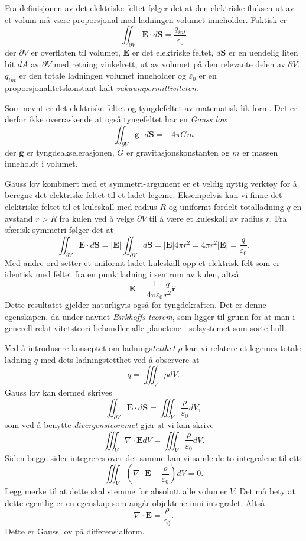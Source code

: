 \documentclass[twoside,utf8]{article}
\begin{document}
Fra definisjonen av det elektriske feltet følger det at den elektriske fluksen ut av et volum må være proporsjonal med ladningen volumet inneholder. Faktisk er
$$
\iint _{\partial V} \mathbf{E}\cdot d\mathbf{S} = \frac{q_{int}}{\varepsilon_0}
$$
der $\partial V$ er overflaten til volumet, $\mathbf{E}$ er det elektriske feltet, $d\mathbf{S}$ er en uendelig liten bit $dA$ av $\partial V$ med retning vinkelrett, ut av volumet på den relevante delen av $\partial V$. $q_{int}$ er den totale ladningen volumet inneholder og $\varepsilon_0$ er en proporsjonalitetskonstant kalt {\it vakuumpermittiviteten}.


  Som nevnt er det elektriske feltet og tyngdefeltet av matematisk lik form. Det er derfor ikke overraskende at også tyngefeltet har en {\it Gauss lov}:
  $$
  \iint _{\partial V} \mathbf{g}\cdot d\mathbf{S} = -4 \pi G m
  $$
  der $\mathbf{g}$ er tyngdeakselerasjonen, $G$ er gravitasjonskonstanten og $m$ er massen inneholdt i volumet.


  Gauss lov kombinert med et symmetri-argument er et veldig nyttig verktøy for å beregne det elektriske feltet til et ladet legeme. Eksempelvis kan vi finne det elektriske feltet til et kuleskall med radius $R$ og uniformt fordelt totalladning $q$ en avstand $r>R$ fra kulen ved å velge $\partial V$ til å være et kuleskall av radius $r$. Fra sfærisk symmetri følger det at
  $$
  \iint _{\partial V} \mathbf{E}\cdot d\mathbf{S}
  =
  |\mathbf{E}| \iint _{\partial V} d\mathbf{S}
  =
  |\mathbf{E}| 4\pi r^2
  =
  4 \pi r^2 |\mathbf{E}|
  =
  \frac{q}{\varepsilon_0}.
  $$
  Med andre ord setter et uniformt ladet kuleskall opp et elektrisk felt som er identisk med feltet fra en punktladning i sentrum av kulen, altså
  $$
  \mathbf{E} = \frac{1}{4\pi \varepsilon_0} \frac{q}{r^2}\hat{\mathbf{r}}.
  $$
  Dette resultatet gjelder naturligvis også for tyngdekraften. Det er denne egenskapen, da under navnet {\it Birkhoffs teorem}, som ligger til grunn for at man i generell relativitetsteori behandler alle planetene i solsystemet som sorte hull.



  Ved å introdusere konseptet om ladnings{\it tetthet} $\rho$ kan vi relatere et legemes totale ladning $q$ med dets ladningstetthet ved å observere at
  $$
  q = \iiint_V \rho dV.
  $$
  Gauss lov kan dermed skrives
  $$
  \iint_{\partial V} \mathbf{E}\cdot d\mathbf{S} = \iiint_V \frac{\rho}{\varepsilon_0} dV,
  $$
  som ved å benytte {\it divergensteoremet} gjør at vi kan skrive
  $$
  \iiint_{V} \nabla \cdot \mathbf{E} dV = \iiint_V \frac{\rho}{\varepsilon_0} dV.
  $$
  Siden begge sider integreres over det samme kan vi samle de to integralene til ett:
  $$
  \iiint_{V} \left( \nabla \cdot \mathbf{E} - \frac{\rho}{\varepsilon_0} \right)dV=0.
  $$
  Legg merke til at dette skal stemme for absolutt alle volumer $V$. Det må bety at dette egentlig er en egenskap som angår objektene inni integralet. Altså
  $$
  \nabla \cdot \mathbf{E} = \frac{\rho}{\varepsilon_0}.
  $$
  Dette er Gauss lov på differensialform.
\end{document}
